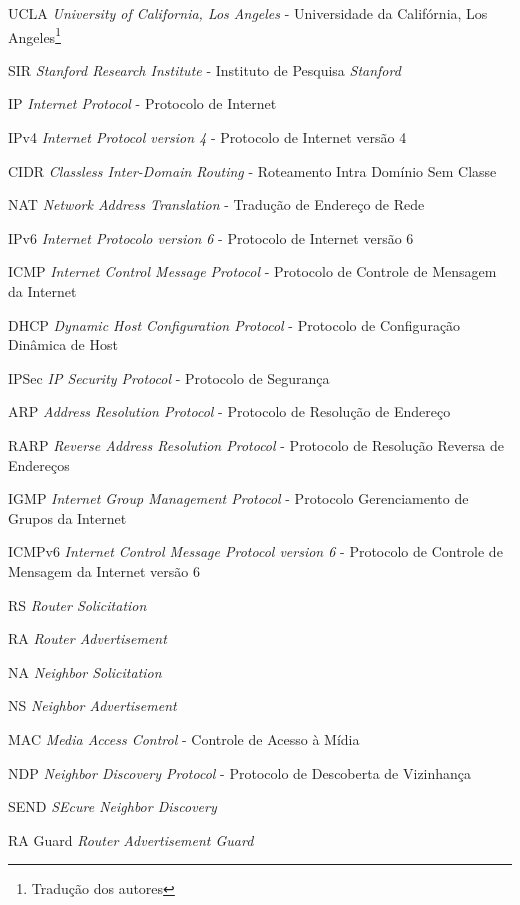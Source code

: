 
\begin{siglas}

	\item[UCLA]     \textit{University of California, Los Angeles} - Universidade da Califórnia, Los Angeles\footnote{Tradução dos autores}
	\item[SIR]      \textit{Stanford Research Institute} - Instituto de Pesquisa \textit{Stanford}\footnotemark[1]
	\item[IP]       \textit{Internet Protocol} - Protocolo de Internet\footnotemark[1]
	\item[IPv4]     \textit{Internet Protocol version 4} - Protocolo de Internet versão 4\footnotemark[1]
	\item[CIDR]     \textit{Classless Inter-Domain Routing} - Roteamento Intra Domínio Sem Classe\footnotemark[1]
	\item[NAT]      \textit{Network Address Translation} - Tradução de Endereço de Rede\footnotemark[1]
	\item[IPv6]     \textit{Internet Protocolo version 6} - Protocolo de Internet versão 6\footnotemark[1]
	\item[ICMP]     \textit{Internet Control Message Protocol} - Protocolo de Controle de Mensagem da Internet\footnotemark[1]
	\item[DHCP]     \textit{Dynamic Host Configuration Protocol} - Protocolo de Configuração Dinâmica de Host\footnotemark[1]
	\item[IPSec]    \textit{IP Security Protocol} - Protocolo de Segurança\footnotemark[1]
	\item[ARP]      \textit{Address Resolution Protocol} - Protocolo de Resolução de Endereço\footnotemark[1]
	\item[RARP]     \textit{Reverse Address Resolution Protocol} - Protocolo de Resolução Reversa de Endereços\footnotemark[1]
	\item[IGMP]     \textit{Internet Group Management Protocol} - Protocolo Gerenciamento de Grupos da Internet\footnotemark[1]
	\item[ICMPv6]   \textit{Internet Control Message Protocol version 6} - Protocolo de Controle de Mensagem da Internet versão 6\footnotemark[1]
	\item[RS]       \textit{Router Solicitation}
	\item[RA]       \textit{Router Advertisement}
	\item[NA]       \textit{Neighbor Solicitation}
	\item[NS]       \textit{Neighbor Advertisement}
	\item[MAC]      \textit{Media Access Control} - Controle de Acesso à Mídia\footnotemark[1]
	\item[NDP]      \textit{Neighbor Discovery Protocol} - Protocolo de Descoberta de Vizinhança\footnotemark[1]
	\item[SEND]     \textit{SEcure Neighbor Discovery}
	\item[RA Guard] \textit{Router Advertisement Guard}


\end{siglas}
